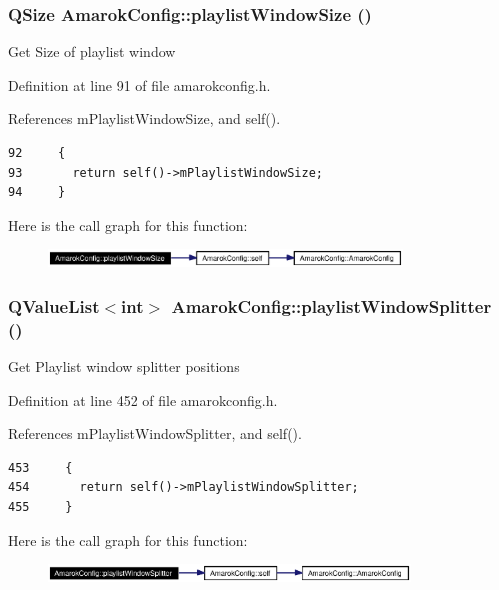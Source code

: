 \subsubsection{\setlength{\rightskip}{0pt plus 5cm}QSize Amarok\-Config::playlist\-Window\-Size ()\hspace{0.3cm}{\tt  [inline, static]}}\label{classAmarokConfig_AmarokConfige8}


Get Size of playlist window 

Definition at line 91 of file amarokconfig.h.

References m\-Playlist\-Window\-Size, and self().



\footnotesize\begin{verbatim}92     {
93       return self()->mPlaylistWindowSize;
94     }
\end{verbatim}\normalsize 


Here is the call graph for this function:\begin{figure}[H]
\begin{center}
\leavevmode
\includegraphics[width=266pt]{classAmarokConfig_AmarokConfige8_cgraph}
\end{center}
\end{figure}
\subsubsection{\setlength{\rightskip}{0pt plus 5cm}QValue\-List$<$int$>$ Amarok\-Config::playlist\-Window\-Splitter ()\hspace{0.3cm}{\tt  [inline, static]}}\label{classAmarokConfig_AmarokConfige46}


Get Playlist window splitter positions 

Definition at line 452 of file amarokconfig.h.

References m\-Playlist\-Window\-Splitter, and self().



\footnotesize\begin{verbatim}453     {
454       return self()->mPlaylistWindowSplitter;
455     }
\end{verbatim}\normalsize 


Here is the call graph for this function:\begin{figure}[H]
\begin{center}
\leavevmode
\includegraphics[width=272pt]{classAmarokConfig_AmarokConfige46_cgraph}
\end{center}
\end{figure}
